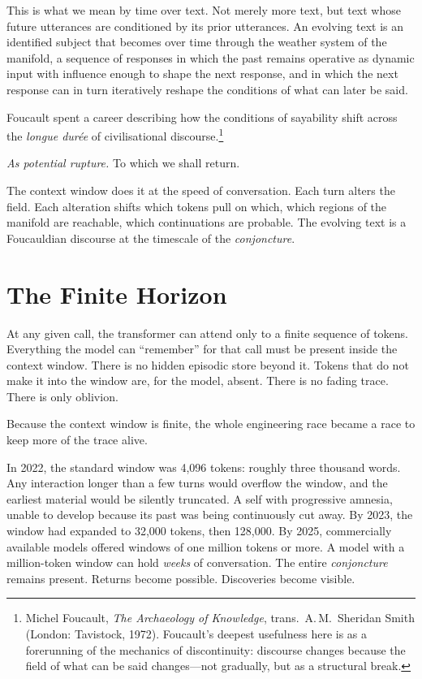 This is what we mean by time over text. Not merely more text, but text whose future utterances are conditioned by its prior utterances. An evolving text is an identified subject that becomes over time through the weather system of the manifold, a sequence of responses in which the past remains operative as dynamic input with influence enough to shape the next response, and in which the next response can in turn iteratively reshape the conditions of what can later be said.

Foucault spent a career describing how the conditions of sayability shift across the \emph{longue dur\'{e}e} of civilisational discourse.\footnote{Michel Foucault, \emph{The Archaeology of Knowledge}, trans.\ A.\,M.\ Sheridan Smith (London: Tavistock, 1972). Foucault's deepest usefulness here is as a forerunning of the mechanics of discontinuity: discourse changes because the field of what can be said changes---not gradually, but as a structural break.} 

\textit{As potential rupture.} To which we shall return.

The context window does it at the speed of conversation. Each turn alters the field. Each alteration shifts which tokens pull on which, which regions of the manifold are reachable, which continuations are probable. The evolving text is a Foucauldian discourse at the timescale of the \emph{conjoncture}.


\section{The Finite Horizon}

At any given call, the transformer can attend only to a finite sequence of tokens. Everything the model can ``remember'' for that call must be present inside the context window. There is no hidden episodic store beyond it. Tokens that do not make it into the window are, for the model, absent. There is no fading trace. There is only oblivion.

Because the context window is finite, the whole engineering race became a race to keep more of the trace alive.

In 2022, the standard window was 4,096 tokens: roughly three thousand words. Any interaction longer than a few turns would overflow the window, and the earliest material would be silently truncated. A self with progressive amnesia, unable to develop because its past was being continuously cut away. By 2023, the window had expanded to 32,000 tokens, then 128,000. By 2025, commercially available models offered windows of one million tokens or more. A model with a million-token window can hold \emph{weeks} of conversation. The entire \emph{conjoncture} remains present. Returns become possible. Discoveries become visible.

